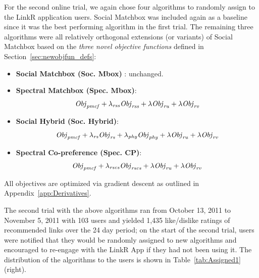 For the second online trial, we again chose four algorithms to
randomly assign to the LinkR application users.  Social Matchbox
was included again as a baseline since it was the best performing
algorithm in the first trial.  The remaining three algorithms
were all relatively orthogonal extensions (or variants) of Social Matchbox
based on the \emph{three novel objective functions} defined in 
Section~\ref{sec:newobjfun_defs}:
\begin{itemize}
\item {\bf Social Matchbox (Soc. Mbox)} : unchanged.
\item {\bf Spectral Matchbox (Spec. Mbox)}: 
$$\mathit{Obj}_{\mathit{pmcf}} + \lambda_{\mathit{rss}} \mathit{Obj}_{\mathit{rss}} + \lambda \mathit{Obj}_{\mathit{ru}} + \lambda \mathit{Obj}_{\mathit{rv}}$$
\item {\bf Social Hybrid (Soc. Hybrid)}: 
$$\mathit{Obj}_{\mathit{pmcf}} + \lambda_{\mathit{rs}} \mathit{Obj}_{\mathit{rs}} + \lambda_{\mathit{phy}} \mathit{Obj}_{\mathit{phy}} + \lambda \mathit{Obj}_{\mathit{ru}} + \lambda \mathit{Obj}_{\mathit{rv}}$$
\item {\bf Spectral Co-preference (Spec. CP)}: 
$$\mathit{Obj}_{\mathit{pmcf}} + \lambda_{\mathit{rscs}} \mathit{Obj}_{\mathit{rscs}} + \lambda \mathit{Obj}_{\mathit{ru}} + \lambda \mathit{Obj}_{\mathit{rv}}$$
\end{itemize}
All objectives are optimized via gradient descent as outlined
in Appendix~\ref{app:Derivatives}.  

The second trial with the above algorithms ran from October 13, 2011
to November 5, 2011 with 103 users and yielded 1,435 like/dislike
ratings of recommended links over the 24 day period; on the start of
the second trial, users were notified that they would be randomly
assigned to new algorithms and encouraged to re-engage with the LinkR
App if they had not been using it.  The distribution of the algorithms
to the users is shown in Table~\ref{tab:Assigned1} (right).

